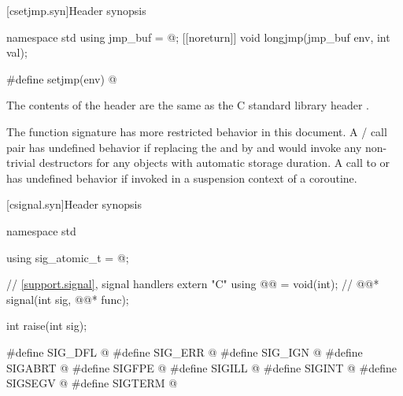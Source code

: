 
[csetjmp.syn]{Header  synopsis}

%
%
%
\begin{codeblock}
namespace std {
  using jmp_buf = @\seebelow@;
  [[noreturn]] void longjmp(jmp_buf env, int val);
}

#define setjmp(env) @\seebelow@
\end{codeblock}

\pnum
The contents of the header  are the same as the C
standard library header .

\pnum
The function signature
%
has more restricted behavior in this document.
A / call pair has undefined
behavior if replacing the  and 
by  and  would invoke any non-trivial destructors for any objects
with automatic storage duration.
A call to  or  has undefined
behavior if invoked in a suspension context of a coroutine.


[csignal.syn]{Header  synopsis}

%
%
%
%
%
%
%
%
%
%
%
%
\begin{codeblock}
namespace std {
  using sig_atomic_t = @\seebelow@;

  // \ref{support.signal}, signal handlers
  extern "C" using @@ = void(int);  // \expos
  @@* signal(int sig, @@* func);

  int raise(int sig);
}

#define SIG_DFL @\seebelow@
#define SIG_ERR @\seebelow@
#define SIG_IGN @\seebelow@
#define SIGABRT @\seebelow@
#define SIGFPE @\seebelow@
#define SIGILL @\seebelow@
#define SIGINT @\seebelow@
#define SIGSEGV @\seebelow@
#define SIGTERM @\seebelow@
\end{codeblock}

